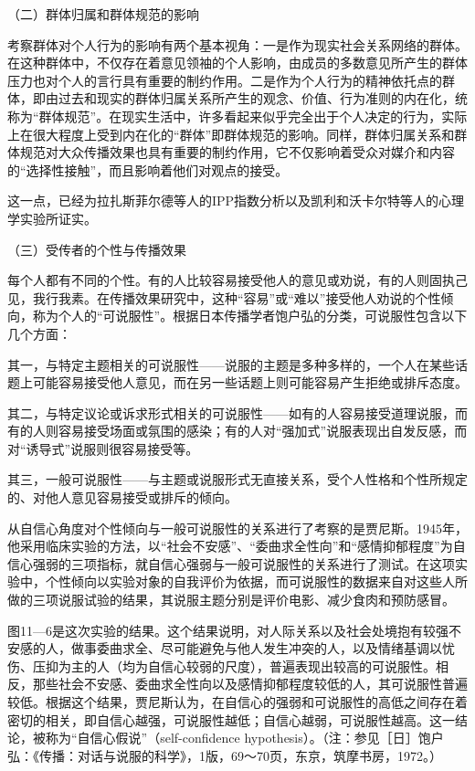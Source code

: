 \documentclass[UTF8,12pt]{ctexart}
\numberwithin{equation}{section} %
\numberwithin{figure}{section}
\numberwithin{table}{section}
\begin{document}
	（二）群体归属和群体规范的影响
	
	考察群体对个人行为的影响有两个基本视角：一是作为现实社会关系网络的群体。在这种群体中，不仅存在着意见领袖的个人影响，由成员的多数意见所产生的群体压力也对个人的言行具有重要的制约作用。二是作为个人行为的精神依托点的群体，即由过去和现实的群体归属关系所产生的观念、价值、行为准则的内在化，统称为“群体规范”。在现实生活中，许多看起来似乎完全出于个人决定的行为，实际上在很大程度上受到内在化的“群体”即群体规范的影响。同样，群体归属关系和群体规范对大众传播效果也具有重要的制约作用，它不仅影响着受众对媒介和内容的“选择性接触”，而且影响着他们对观点的接受。
	
	这一点，已经为拉扎斯菲尔德等人的IPP指数分析以及凯利和沃卡尔特等人的心理学实验所证实。
	
	（三）受传者的个性与传播效果
	
	每个人都有不同的个性。有的人比较容易接受他人的意见或劝说，有的人则固执己见，我行我素。在传播效果研究中，这种“容易”或“难以”接受他人劝说的个性倾向，称为个人的“可说服性”。根据日本传播学者饱户弘的分类，可说服性包含以下几个方面：
	
	其一，与特定主题相关的可说服性——说服的主题是多种多样的，一个人在某些话题上可能容易接受他人意见，而在另一些话题上则可能容易产生拒绝或排斥态度。
	
	其二，与特定议论或诉求形式相关的可说服性——如有的人容易接受道理说服，而有的人则容易接受场面或氛围的感染；有的人对“强加式”说服表现出自发反感，而对“诱导式”说服则很容易接受等。
	
	其三，一般可说服性——与主题或说服形式无直接关系，受个人性格和个性所规定的、对他人意见容易接受或排斥的倾向。
	
	从自信心角度对个性倾向与一般可说服性的关系进行了考察的是贾尼斯。1945年，他采用临床实验的方法，以“社会不安感”、“委曲求全性向”和“感情抑郁程度”为自信心强弱的三项指标，就自信心强弱与一般可说服性的关系进行了测试。在这项实验中，个性倾向以实验对象的自我评价为依据，而可说服性的数据来自对这些人所做的三项说服试验的结果，其说服主题分别是评价电影、减少食肉和预防感冒。
	
	图11—6是这次实验的结果。这个结果说明，对人际关系以及社会处境抱有较强不安感的人，做事委曲求全、尽可能避免与他人发生冲突的人，以及情绪基调以忧伤、压抑为主的人（均为自信心较弱的尺度），普遍表现出较高的可说服性。相反，那些社会不安感、委曲求全性向以及感情抑郁程度较低的人，其可说服性普遍较低。根据这个结果，贾尼斯认为，在自信心的强弱和可说服性的高低之间存在着密切的相关，即自信心越强，可说服性越低；自信心越弱，可说服性越高。这一结论，被称为“自信心假说”（self-confidence hypothesis）。（注：参见［日］饱户弘：《传播：对话与说服的科学》，1版，69～70页，东京，筑摩书房，1972。）
	
\end{document}
